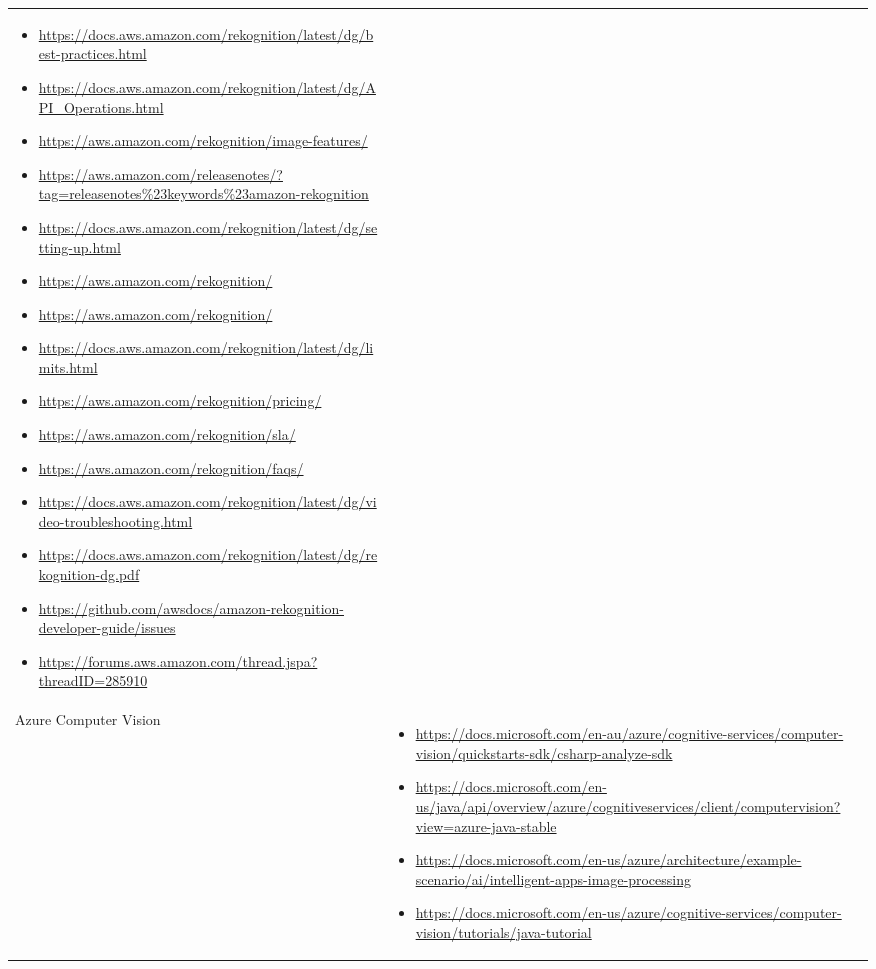 {\begin{longtable}{p{.2\linewidth}|p{.725\linewidth}}
\begin{itemize}[label=,leftmargin=10pt,topsep=0pt,partopsep=0pt,noitemsep,nolistsep,itemindent=-10pt]
\item \url{https://docs.aws.amazon.com/rekognition/latest/dg/best-practices.html}
\item \url{https://docs.aws.amazon.com/rekognition/latest/dg/API_Operations.html}
\item \url{https://aws.amazon.com/rekognition/image-features/}
\item \url{https://aws.amazon.com/releasenotes/?tag=releasenotes%23keywords%23amazon-rekognition}
\item \url{https://docs.aws.amazon.com/rekognition/latest/dg/setting-up.html}
\item \url{https://aws.amazon.com/rekognition/}
\item \url{https://aws.amazon.com/rekognition/}
\item \url{https://docs.aws.amazon.com/rekognition/latest/dg/limits.html}
\item \url{https://aws.amazon.com/rekognition/pricing/}
\item \url{https://aws.amazon.com/rekognition/sla/}
\item \url{https://aws.amazon.com/rekognition/faqs/}
\item \url{https://docs.aws.amazon.com/rekognition/latest/dg/video-troubleshooting.html}
\item \url{https://docs.aws.amazon.com/rekognition/latest/dg/rekognition-dg.pdf}
\item \url{https://github.com/awsdocs/amazon-rekognition-developer-guide/issues}
\item \url{https://forums.aws.amazon.com/thread.jspa?threadID=285910}
    \end{itemize}\\
    Azure Computer Vision &
    \vspace{-1.75mm}
    \begin{itemize}[label=,leftmargin=10pt,topsep=0pt,partopsep=0pt,noitemsep,nolistsep,itemindent=-10pt]
\item \url{https://docs.microsoft.com/en-au/azure/cognitive-services/computer-vision/quickstarts-sdk/csharp-analyze-sdk}
\item \url{https://docs.microsoft.com/en-us/java/api/overview/azure/cognitiveservices/client/computervision?view=azure-java-stable}
\item \url{https://docs.microsoft.com/en-us/azure/architecture/example-scenario/ai/intelligent-apps-image-processing}
\item \url{https://docs.microsoft.com/en-us/azure/cognitive-services/computer-vision/tutorials/java-tutorial}

\end{itemize}
\end{longtable}}
